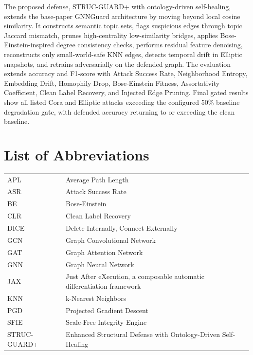 \documentclass[12pt,oneside]{report}
\begin{document}
The proposed defense, STRUC-GUARD+ with ontology-driven self-healing, extends the base-paper GNNGuard architecture by moving beyond local cosine similarity. It constructs semantic topic sets, flags suspicious edges through topic Jaccard mismatch, prunes high-centrality low-similarity bridges, applies Bose-Einstein-inspired degree consistency checks, performs residual feature denoising, reconstructs only small-world-safe KNN edges, detects temporal drift in Elliptic snapshots, and retrains adversarially on the defended graph. The evaluation extends accuracy and F1-score with Attack Success Rate, Neighborhood Entropy, Embedding Drift, Homophily Drop, Bose-Einstein Fitness, Assortativity Coefficient, Clean Label Recovery, and Injected Edge Pruning. Final gated results show all listed Cora and Elliptic attacks exceeding the configured 50\% baseline degradation gate, with defended accuracy returning to or exceeding the clean baseline.

\clearpage
\tableofcontents
\clearpage
\listoftables
\clearpage
\listoffigures
\clearpage

\chapter*{List of Abbreviations}
\begin{longtable}{p{1.3in}p{4.3in}}
APL & Average Path Length\\
ASR & Attack Success Rate\\
BE & Bose-Einstein\\
CLR & Clean Label Recovery\\
DICE & Delete Internally, Connect Externally\\
GCN & Graph Convolutional Network\\
GAT & Graph Attention Network\\
GNN & Graph Neural Network\\
JAX & Just After eXecution, a composable automatic differentiation framework\\
KNN & k-Nearest Neighbors\\
PGD & Projected Gradient Descent\\
SFIE & Scale-Free Integrity Engine\\
STRUC-GUARD+ & Enhanced Structural Defense with Ontology-Driven Self-Healing\\
\end{longtable}

\clearpage
{}
\end{document}
